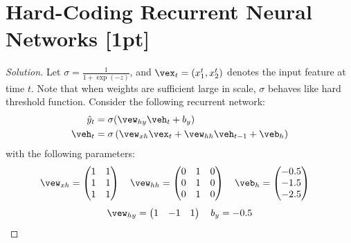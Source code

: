 \documentclass{article}
\begin{document}
	\section{Hard-Coding Recurrent Neural Networks [1pt]}
	\begin{proof}[Solution]
		Let $\sigma = \frac{1}{1 + \exp(-z)}$, and $\vex_t = (x_1^t, x_2^t)$ denotes the input feature at time $t$. Note that when weights are sufficient large in scale, $\sigma$ behaves like hard threshold function.
		Consider the following recurrent network:
		\begin{align}
			\hat{y}_t &= \sigma(\vew_{hy} \veh_t + b_y)\\
			\veh_t &= \sigma\left(
				\vew_{xh} \vex_t
				+ \vew_{hh} \veh_{t-1}
				+ \veb_h
			\right)
		\end{align}
		with the following parameters:
		\begin{align}
			\vew_{xh} &= 
			\begin{pmatrix}
				 1 & 1 \\
				 1 & 1 \\
				 1 & 1
			\end{pmatrix}
			\quad
			\vew_{hh} = 
			\begin{pmatrix}
				0 & 1 & 0 \\
				0 & 1 & 0 \\
				0 & 1 & 0
			\end{pmatrix}
			\quad
			\veb_h = \begin{pmatrix}
				-0.5 \\ -1.5 \\ -2.5
			\end{pmatrix}
		\end{align}
		\begin{align}
			\vew_{hy} = 
			\begin{pmatrix}
				1 & -1 & 1
			\end{pmatrix}
			\quad
			b_y = -0.5
		\end{align}
		

\end{proof}
\end{document}
